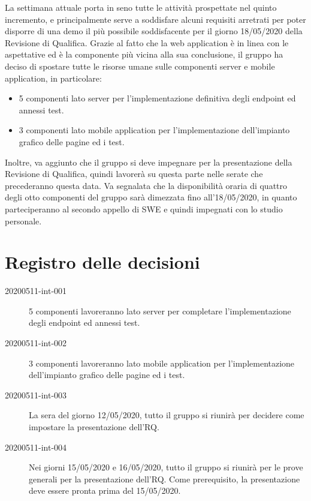 \documentclass{article}
\begin{document}
La settimana attuale porta in seno tutte le attività prospettate nel quinto incremento, e principalmente serve a soddisfare alcuni requisiti arretrati per poter disporre di una demo il più possibile soddisfacente per il giorno 18/05/2020 della Revisione di Qualifica.
Grazie al fatto che la web application è in linea con le aspettative ed è la componente più vicina alla sua conclusione, il gruppo ha deciso di spostare tutte le risorse umane sulle componenti server e mobile application, in particolare:
\begin{itemize}
  \item 5 componenti lato server per l'implementazione definitiva degli endpoint ed annessi test.
  \item 3 componenti lato mobile application per l'implementazione dell'impianto grafico delle pagine ed i test.
\end{itemize}
Inoltre, va aggiunto che il gruppo si deve impegnare per la presentazione della Revisione di Qualifica, quindi lavorerà su questa parte nelle serate che precederanno questa data.
Va segnalata che la disponibilità oraria di quattro degli otto componenti del gruppo sarà dimezzata fino all'18/05/2020, in quanto parteciperanno al secondo appello di SWE e quindi impegnati con lo studio personale.

\newpage
\section{Registro delle decisioni}%
\label{sec:registro_delle_decisioni}

\begin{description}
  \item[20200511-int-001] 5 componenti lavoreranno lato server per completare l'implementazione degli endpoint ed annessi test.
  \item[20200511-int-002] 3 componenti lavoreranno lato mobile application per l'implementazione dell'impianto grafico delle pagine ed i test.
  \item[20200511-int-003] La sera del giorno 12/05/2020, tutto il gruppo si riunirà per decidere come impostare la presentazione dell'RQ\@.
  \item[20200511-int-004] Nei giorni 15/05/2020 e 16/05/2020, tutto il gruppo si riunirà per le prove generali per la presentazione dell'RQ\@. Come prerequisito, la presentazione deve essere pronta prima del 15/05/2020.
\end{description}

\end{document}
